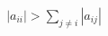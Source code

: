 \documentclass[preview]{standalone}
\begin{document}
\begin{align*}
|a_{ii}| > \sum_{j \neq i} |a_{ij}|
\end{align*}
\end{document}
